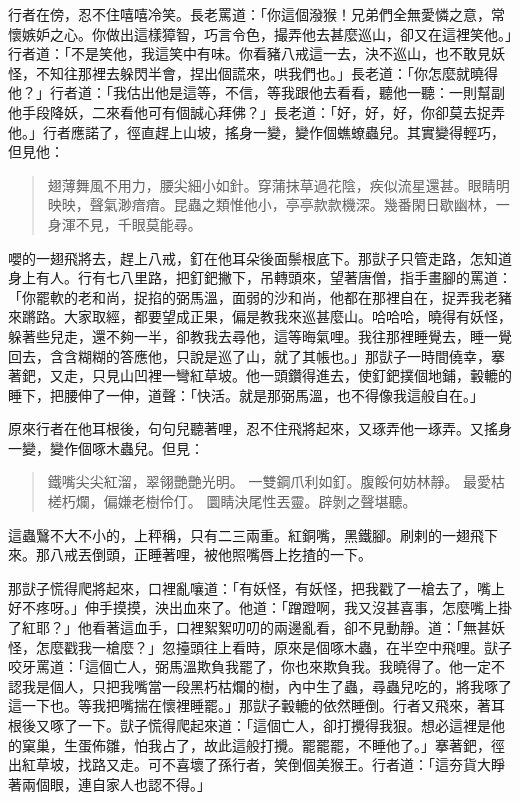 行者在傍，忍不住嘻嘻冷笑。長老罵道：「你這個潑猴！兄弟們全無愛憐之意，常懷嫉妒之心。你做出這樣獐智，巧言令色，撮弄他去甚麼巡山，卻又在這裡笑他。」行者道：「不是笑他，我這笑中有味。你看豬八戒這一去，決不巡山，也不敢見妖怪，不知往那裡去躲閃半會，捏出個謊來，哄我們也。」長老道：「你怎麼就曉得他？」行者道：「我估出他是這等，不信，等我跟他去看看，聽他一聽：一則幫副他手段降妖，二來看他可有個誠心拜佛？」長老道：「好，好，好，你卻莫去捉弄他。」行者應諾了，徑直趕上山坡，搖身一變，變作個蟭蟟蟲兒。其實變得輕巧，但見他：
\begin{quote}
翅薄舞風不用力，腰尖細小如針。穿蒲抹草過花陰，疾似流星還甚。眼睛明映映，聲氣渺瘖瘖。昆蟲之類惟他小，亭亭款款機深。幾番閑日歇幽林，一身渾不見，千眼莫能尋。
\end{quote}

嚶的一翅飛將去，趕上八戒，釘在他耳朵後面鬃根底下。那獃子只管走路，怎知道身上有人。行有七八里路，把釘鈀撇下，吊轉頭來，望著唐僧，指手畫腳的罵道：「你罷軟的老和尚，捉掐的弼馬溫，面弱的沙和尚，他都在那裡自在，捉弄我老豬來蹡路。大家取經，都要望成正果，偏是教我來巡甚麼山。哈哈哈，曉得有妖怪，躲著些兒走，還不夠一半，卻教我去尋他，這等晦氣哩。我往那裡睡覺去，睡一覺回去，含含糊糊的答應他，只說是巡了山，就了其帳也。」那獃子一時間僥幸，搴著鈀，又走，只見山凹裡一彎紅草坡。他一頭鑽得進去，使釘鈀撲個地鋪，轂轆的睡下，把腰伸了一伸，道聲：「快活。就是那弼馬溫，也不得像我這般自在。」

原來行者在他耳根後，句句兒聽著哩，忍不住飛將起來，又琢弄他一琢弄。又搖身一變，變作個啄木蟲兒。但見：
\begin{quote}
鐵嘴尖尖紅溜，翠翎艷艷光明。
一雙鋼爪利如釘。腹餒何妨林靜。
最愛枯槎朽爛，偏嫌老樹伶仃。
圜睛決尾性丟靈。辟剝之聲堪聽。
\end{quote}

這蟲鷖不大不小的，上秤稱，只有二三兩重。紅銅嘴，黑鐵腳。刷剌的一翅飛下來。那八戒丟倒頭，正睡著哩，被他照嘴唇上扢揸的一下。

那獃子慌得爬將起來，口裡亂嚷道：「有妖怪，有妖怪，把我戳了一槍去了，嘴上好不疼呀。」伸手摸摸，泱出血來了。他道：「蹭蹬啊，我又沒甚喜事，怎麼嘴上掛了紅耶？」他看著這血手，口裡絮絮叨叨的兩邊亂看，卻不見動靜。道：「無甚妖怪，怎麼戳我一槍麼？」忽擡頭往上看時，原來是個啄木蟲，在半空中飛哩。獃子咬牙罵道：「這個亡人，弼馬溫欺負我罷了，你也來欺負我。我曉得了。他一定不認我是個人，只把我嘴當一段黑朽枯爛的樹，內中生了蟲，尋蟲兒吃的，將我啄了這一下也。等我把嘴揣在懷裡睡罷。」那獃子轂轆的依然睡倒。行者又飛來，著耳根後又啄了一下。獃子慌得爬起來道：「這個亡人，卻打攪得我狠。想必這裡是他的窠巢，生蛋佈雛，怕我占了，故此這般打攪。罷罷罷，不睡他了。」搴著鈀，徑出紅草坡，找路又走。可不喜壞了孫行者，笑倒個美猴王。行者道：「這夯貨大睜著兩個眼，連自家人也認不得。」

